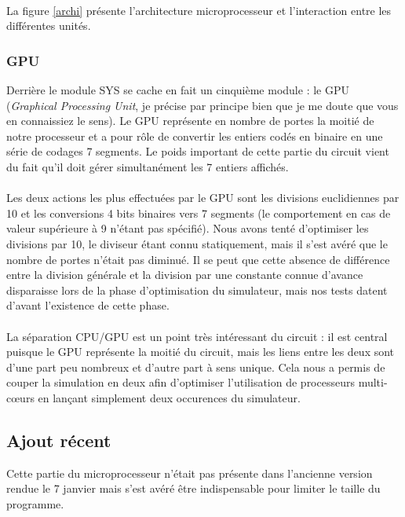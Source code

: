 \documentclass{article}
\begin{document}
\paragraph{}La figure \ref{archi} présente l'architecture microprocesseur et l'interaction
entre les différentes unités.


\subsubsection{GPU}
Derrière le module SYS se cache en fait un cinquième module : le GPU (\emph{Graphical Processing Unit}, je précise par principe bien que je me doute que vous en connaissiez le sens). Le GPU représente en nombre de portes la moitié de notre processeur et a pour rôle de convertir les entiers codés en binaire en une série de codages 7 segments. Le poids important de cette partie du circuit vient du fait qu'il doit gérer simultanément les 7 entiers affichés.

\paragraph{}Les deux actions les plus effectuées par le GPU sont les divisions euclidiennes par 10 et les conversions 4 bits binaires vers 7 segments (le comportement en cas de valeur supérieure à 9 n'étant pas spécifié). Nous avons tenté d'optimiser les divisions par 10, le diviseur étant connu statiquement, mais il s'est avéré que le nombre de portes n'était pas diminué. Il se peut que cette absence de différence entre la division générale et la division par une constante connue d'avance disparaisse lors de la phase d'optimisation du simulateur, mais nos tests datent d'avant l'existence de cette phase.

\paragraph{}La séparation CPU/GPU est un point très intéressant du circuit : il est central puisque le GPU représente la moitié du circuit, mais les liens entre les deux sont d'une part peu nombreux et d'autre part à sens unique. Cela nous a permis de couper la simulation en deux afin d'optimiser l'utilisation de processeurs multi-cœurs en lançant simplement deux occurences du simulateur.


\subsection{Ajout récent}
\label{micro_update}
Cette partie du microprocesseur n'était pas présente dans l'ancienne version rendue le 7 janvier mais s'est avéré être indispensable pour limiter le taille du programme.
\end{document}
